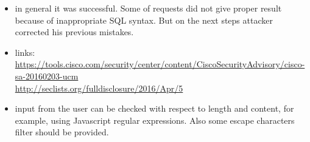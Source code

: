 \documentclass{article}
\begin{document}
\begin{itemize}
\item in general it was successful. Some of requests did not give proper result because of inappropriate SQL syntax. But on the next steps attacker corrected his previous mistakes.
\item links:\\
\url{https://tools.cisco.com/security/center/content/CiscoSecurityAdvisory/cisco-sa-20160203-ucm}\\
\url{http://seclists.org/fulldisclosure/2016/Apr/5}
\item input from the user can be checked with respect to length and content, for example, using Javascript regular expressions. Also some escape characters filter should be provided.
\end{itemize}
\end{document}
